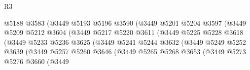 \begin{lexlean}{R3}
\begin{coremodule}
                                      @5188
                                      @3583
                                      (@3449
                                        @5193
                                        @5196
                                        @3590
                                        (@3449
                                          @5201
                                          @5204
                                          @3597
                                          (@3449
                                            @5209
                                            @5212
                                            @3604
                                            (@3449
                                              @5217
                                              @5220
                                              @3611
                                              (@3449
                                                @5225
                                                @5228
                                                @3618
                                                (@3449
                                                  @5233
                                                  @5236
                                                  @3625
                                                  (@3449
                                                    @5241
                                                    @5244
                                                    @3632
                                                    (@3449
                                                      @5249
                                                      @5252
                                                      @3639
                                                      (@3449
                                                        @5257
                                                        @5260
                                                        @3646
                                                        (@3449
                                                          @5265
                                                          @5268
                                                          @3653
                                                          (@3449
                                                            @5273
                                                            @5276
                                                            @3660
                                                            (@3449

\end{coremodule}
\end{lexlean}

